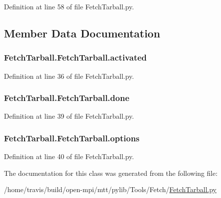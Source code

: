 Definition at line 58 of file Fetch\-Tarball.\-py.



\subsection{Member Data Documentation}
\hypertarget{class_fetch_tarball_1_1_fetch_tarball_a4e6818fd64191913c3f302485c2c4e96}{
\subsubsection[{activated}]{\setlength{\rightskip}{0pt plus 5cm}Fetch\-Tarball.\-Fetch\-Tarball.\-activated}}\label{class_fetch_tarball_1_1_fetch_tarball_a4e6818fd64191913c3f302485c2c4e96}


Definition at line 36 of file Fetch\-Tarball.\-py.

\hypertarget{class_fetch_tarball_1_1_fetch_tarball_ae733fd553804854c3beef59df1739732}{
\subsubsection[{done}]{\setlength{\rightskip}{0pt plus 5cm}Fetch\-Tarball.\-Fetch\-Tarball.\-done}}\label{class_fetch_tarball_1_1_fetch_tarball_ae733fd553804854c3beef59df1739732}


Definition at line 39 of file Fetch\-Tarball.\-py.

\hypertarget{class_fetch_tarball_1_1_fetch_tarball_ae5c7611a1ef415c3e38c75ea803ef2e3}{
\subsubsection[{options}]{\setlength{\rightskip}{0pt plus 5cm}Fetch\-Tarball.\-Fetch\-Tarball.\-options}}\label{class_fetch_tarball_1_1_fetch_tarball_ae5c7611a1ef415c3e38c75ea803ef2e3}


Definition at line 40 of file Fetch\-Tarball.\-py.



The documentation for this class was generated from the following file\-:\begin{DoxyCompactItemize}
\item 
/home/travis/build/open-\/mpi/mtt/pylib/\-Tools/\-Fetch/\hyperlink{_fetch_tarball_8py}{Fetch\-Tarball.\-py}\end{DoxyCompactItemize}
